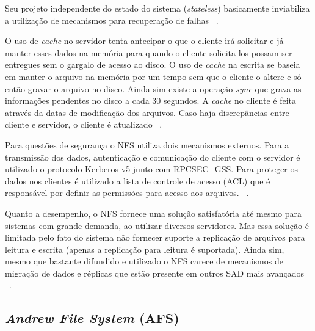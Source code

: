     Seu projeto independente do estado do sistema (\textit{stateless}) basicamente inviabiliza a utilização de mecanismos para recuperação de falhas ~\cite{coulouris}.
    
    O uso de \textit{cache} no servidor tenta antecipar o que o cliente irá solicitar e já manter esses dados na memória para quando o cliente solicita-los possam ser entregues sem o gargalo de acesso ao disco. O uso de \textit{cache} na escrita se baseia em manter o arquivo na memória por um tempo sem que o cliente o altere e só então gravar o arquivo no disco. Ainda sim existe a operação \textit{sync} que grava as informações pendentes no disco a cada 30 segundos.
    A \textit{cache} no cliente é feita através da datas de modificação dos arquivos. Caso haja discrepâncias entre cliente e servidor, o cliente é atualizado ~\cite{coulouris}.
    
    Para questões de segurança o NFS utiliza dois mecanismos externos. Para a transmissão dos dados, autenticação e comunicação do cliente com o servidor é utilizado o protocolo Kerberos v5 junto com RPCSEC\_GSS. Para proteger os dados nos clientes é utilizado a lista de controle de acesso (ACL) que é responsável por definir as permissões para acesso aos arquivos. ~\cite{tanenbaum}.
    
    Quanto a desempenho, o NFS fornece uma solução satisfatória até mesmo para sistemas com grande demanda, ao utilizar diversos servidores. Mas essa solução é limitada pelo fato do sistema não fornecer suporte a replicação de arquivos para leitura e escrita (apenas a replicação para leitura é suportada). Ainda sim, mesmo que bastante difundido e utilizado o NFS carece de mecanismos de migração de dados e réplicas que estão presente em outros SAD mais avançados ~\cite{coulouris}.
    
    
    
    \subsection{\textit{Andrew File System} (AFS)}
    
